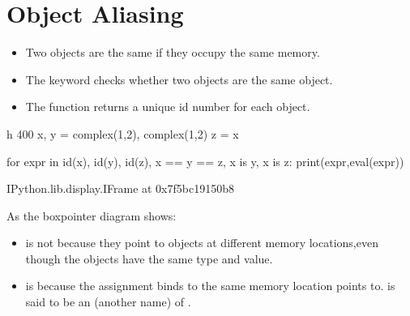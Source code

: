 \documentclass[letterpaper,10pt,english]{sphinxmanual}
\begin{document}
\section{Object Aliasing}
\label{\detokenize{Lecture5/Objects:object-aliasing}}
\begin{itemize}
\item {} 
Two objects are the same if they occupy the same memory.

\item {} 
The keyword  checks whether two objects are the same object.

\item {} 
The function  returns a unique id number for each object.

\end{itemize}

\begin{sphinxVerbatim}[commandchars=\\\{\}]
 \PYGZhy{}h 400
x, y = complex(1,2), complex(1,2)
z = x

for expr in \PYGZsq{}id(x)\PYGZsq{}, \PYGZsq{}id(y)\PYGZsq{}, \PYGZsq{}id(z)\PYGZsq{}, \PYGZsq{}x == y == z\PYGZsq{}, \PYGZsq{}x is y\PYGZsq{}, \PYGZsq{}x is z\PYGZsq{}:
    print(expr,eval(expr))
\end{sphinxVerbatim}

\begin{sphinxVerbatim}[commandchars=\\\{\}]
\PYGZlt{}IPython.lib.display.IFrame at 0x7f5bc19150b8\PYGZgt{}
\end{sphinxVerbatim}

As the box\sphinxhyphen{}pointer diagram shows:
\begin{itemize}
\item {} 
 is not  because they point to objects at different memory locations,even though the objects have the same type and value.

\item {} 
 is  because the assignment  binds  to the same memory location  points to. is said to be an  (another name) of .

\end{itemize}
\end{document}
